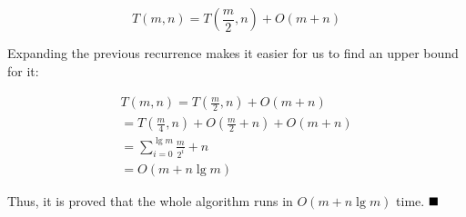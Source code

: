 \documentclass[8pt,a4paper]{article}
\begin{document}
\begin{equation*}
  T(m, n) = T\left(\frac{m}{2}, n\right) + O(m + n)
\end{equation*}

  Expanding the previous recurrence makes it easier for us to find an upper
bound for it:

\begin{equation*}
  \begin{split}
    T(m, n) = T\left(\frac{m}{2}, n\right) + O(m + n) \\
    = T\left(\frac{m}{4}, n\right) + O\left(\frac{m}{2} + n\right) + O(m + n) \\
    = \sum\limits_{i = 0}^{\lg m} \frac{m}{2^{i}} + n \\
    = O(m + n\lg m)
  \end{split}
\end{equation*}

  Thus, it is proved that the whole algorithm runs in $O(m + n\lg m)$ time. $\qed$
\end{document}

